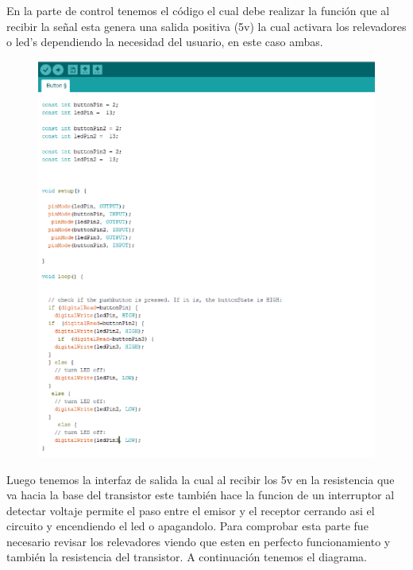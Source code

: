 \documentclass[11pt,a4paper]{article}
\begin{document}
En la parte de control tenemos el código el cual debe realizar  la función que al recibir la señal esta genera una salida positiva (5v) la cual activara los relevadores o led's dependiendo la necesidad del usuario, en este caso ambas.\\
\begin{figure}[hbtp]
\centering
\includegraphics[scale=0.40]{codigo.png} 
\end{figure}

Luego tenemos la interfaz de salida la cual al recibir los 5v en la resistencia que va hacia la base del transistor este también hace la funcion de un interruptor al detectar voltaje permite el paso entre el emisor y el receptor cerrando asi el circuito y encendiendo el led o apagandolo. Para comprobar esta parte fue necesario revisar los relevadores viendo que esten en perfecto funcionamiento y también la resistencia del transistor. A continuación tenemos el diagrama.
\end{document}
